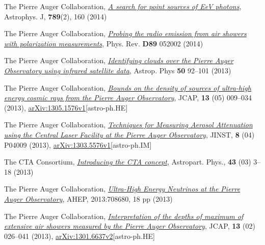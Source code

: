 \begin{etaremune}
\item {}The Pierre Auger Collaboration, \href{http://iopscience.iop.org/0004-637X/789/2/160}{\emph{A search for point sources of EeV photons}}, Astrophys. J, {\bf{789}}(2), 160 (2014)

\item {}The Pierre Auger Collaboration, \href{http://dx.doi.org/10.1103/PhysRevD.89.052002}{\emph{Probing the radio emission from air showers with polarization measurements}}, Phys. Rev. {\bf{D89}} 052002 (2014)

\item {}The Pierre Auger Collaboration, \href{http://dx.doi.org/10.1016/j.astropartphys.2013.09.004}{\emph{Identifying clouds over the Pierre Auger Observatory using infrared satellite data}}, Astrop. Phys {\bf{50}} 92--101 (2013)

\item {}The Pierre Auger Collaboration, \href{http://dx.doi.org/10.1088/1475-7516/2013/05/009}{\emph{Bounds on the density of sources of ultra-high energy cosmic rays from the Pierre Auger Observatory}}, JCAP, {\bf{13}} (05) 009--034 (2013), \href{http://arxiv.org/abs/1305.1576}{arXiv:1305.1576v1}[astro-ph.HE]

\item {}The Pierre Auger Collaboration, \href{http://dx.doi.org/10.1088/1748-0221/8/04/P04009}{\emph{Techniques for Measuring Aerosol Attenuation using the Central Laser Facility at the Pierre Auger Observatory}}, JINST, {\bf{8}} (04) P04009 (2013), \href{http://arxiv.org/abs/1303.5576}{arXiv:1303.5576v1}[astro-ph.IM]

\item {}The CTA Consortium, \href{http://dx.doi.org/10.1016/j.astropartphys.2013.01.007}{\emph{Introducing the CTA concept}}, Astropart. Phys., {\bf{43}} (03) 3--18 (2013)

\item {}The Pierre Auger Collaboration, \href{http://dx.doi.org/10.1155/2013/708680
}{\emph{Ultra-High Energy Neutrinos at the Pierre Auger Observatory}}, AHEP, 2013:708680, 18 pp (2013)

\item {}The Pierre Auger Collaboration, \href{http://dx.doi.org/10.1088/1475-7516/2013/02/026}{\emph{Interpretation of the depths of maximum of extensive air showers measured by the Pierre Auger Observatory}}, JCAP, {\bf{13}} (02) 026--041 (2013), \href{http://arxiv.org/abs/1301.6637}{arXiv:1301.6637v2}[astro-ph.HE]


\end{etaremune}

